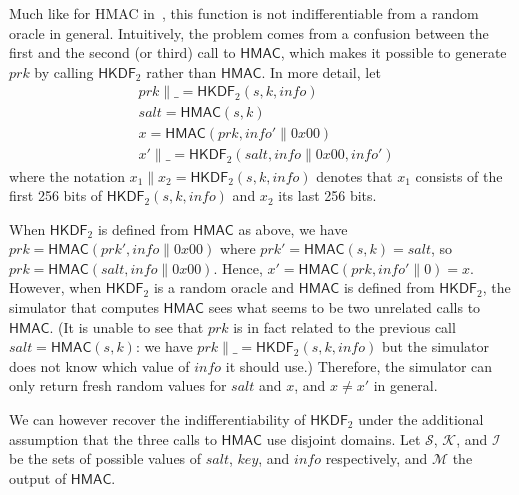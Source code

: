 \documentclass[compsoc, conference, letterpaper, 10pt, times]{IEEEtran}
\newcommand{\HKDF}{\mathsf{HKDF}}
\newcommand{\hkdftwo}{\HKDF_2}
\newcommand{\salt}{\mathit{salt}}
\newcommand{\key}{\mathit{key}}
\newcommand{\info}{\mathit{info}}
\newcommand{\prk}{\mathit{prk}}
\newcommand{\hmac}{\mathsf{HMAC}}
\newcommand{\Ssalt}{\mathcal{S}}
\newcommand{\Skey}{\mathcal{K}}
\newcommand{\Sinfo}{\mathcal{I}}
\newcommand{\Smac}{\mathcal{M}}
\begin{document}
Much like for HMAC in~\cite{Dodis12}, this function is not indifferentiable from a random oracle in general. Intuitively, the problem comes from a confusion between the first and the second (or third) call to $\hmac$, which makes it possible to generate $\prk$ by calling $\hkdftwo$ rather than $\hmac$. In more detail, let
\begin{align*}
&\prk \|\_ = \hkdftwo(s,k,\info)\\
&\salt = \hmac(s,k)\\
&x = \hmac(\prk,\info'\|0x00)\\
&x' \|\_ = \hkdftwo(\salt,\info\|0x00,\info')
\end{align*}
where the notation $x_1 \|x_2 = \hkdftwo(s,k,\info)$
denotes that $x_1$ consists of the first 256 bits of $\hkdftwo(s,k,\info)$ 
and $x_2$ its last 256 bits.

When $\hkdftwo$ is defined from $\hmac$ as above, we have 
$\prk = \hmac(\prk', \info\|0x00)$ where $\prk' = \hmac(s,k) = \salt$,
so $\prk = \hmac(\salt,\info\|0x00)$. Hence, $x' = \hmac(\prk,\info'\|0) = x$.
However, when $\hkdftwo$ is a random oracle and $\hmac$ is defined
from $\hkdftwo$, the simulator that computes $\hmac$ sees what seems
to be two unrelated calls to $\hmac$. (It is unable to see that $\prk$
is in fact related to the previous call $\salt = \hmac(s,k)$: we have 
$\prk \|\_ = \hkdftwo(s,k,\info)$ but the simulator does not know which value
of $\info$ it should use.) Therefore, the simulator can only return fresh random
values for $\salt$ and $x$, and $x \neq x'$ in general.

We can however recover the indifferentiability of $\hkdftwo$ under the 
additional assumption that the three calls to $\hmac$ use disjoint domains.
Let $\Ssalt$, $\Skey$, and $\Sinfo$ be the sets of possible values of $\salt$, 
$\key$, and $\info$ respectively, and $\Smac$ the output of $\hmac$.
\end{document}
